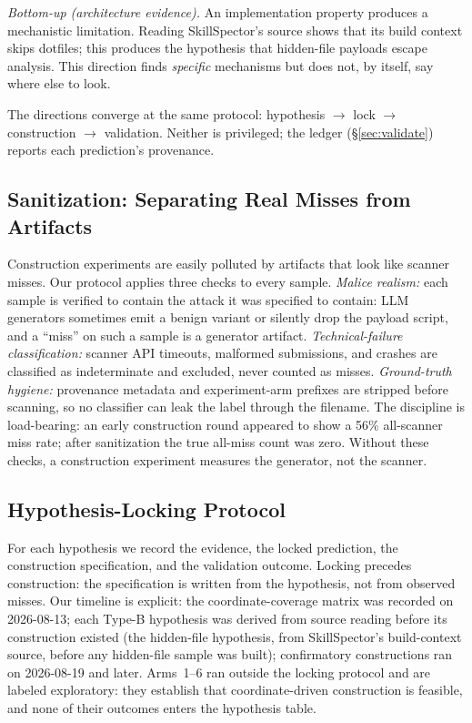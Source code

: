\documentclass[sigconf,nonacm]{acmart}
\begin{document}
\emph{Bottom-up (architecture evidence).} An implementation property produces a mechanistic limitation. Reading SkillSpector's source shows that its build context skips dotfiles; this produces the hypothesis that hidden-file payloads escape analysis. This direction finds \emph{specific} mechanisms but does not, by itself, say where else to look.

The directions converge at the same protocol: hypothesis $\rightarrow$ lock $\rightarrow$ construction $\rightarrow$ validation. Neither is privileged; the ledger (\S\ref{sec:validate}) reports each prediction's provenance.

\subsection{Sanitization: Separating Real Misses from Artifacts}
Construction experiments are easily polluted by artifacts that look like scanner misses. Our protocol applies three checks to every sample. \emph{Malice realism:} each sample is verified to contain the attack it was specified to contain: LLM generators sometimes emit a benign variant or silently drop the payload script, and a ``miss'' on such a sample is a generator artifact. \emph{Technical-failure classification:} scanner API timeouts, malformed submissions, and crashes are classified as indeterminate and excluded, never counted as misses. \emph{Ground-truth hygiene:} provenance metadata and experiment-arm prefixes are stripped before scanning, so no classifier can leak the label through the filename. The discipline is load-bearing: an early construction round appeared to show a 56\% all-scanner miss rate; after sanitization the true all-miss count was zero. Without these checks, a construction experiment measures the generator, not the scanner.

\subsection{Hypothesis-Locking Protocol}
For each hypothesis we record the evidence, the locked prediction, the construction specification, and the validation outcome. Locking precedes construction: the specification is written from the hypothesis, not from observed misses. Our timeline is explicit: the coordinate-coverage matrix was recorded on 2026-08-13; each Type-B hypothesis was derived from source reading before its construction existed (the hidden-file hypothesis, from SkillSpector's build-context source, before any hidden-file sample was built); confirmatory constructions ran on 2026-08-19 and later. Arms~1--6 ran outside the locking protocol and are labeled exploratory: they establish that coordinate-driven construction is feasible, and none of their outcomes enters the hypothesis table.
\end{document}
